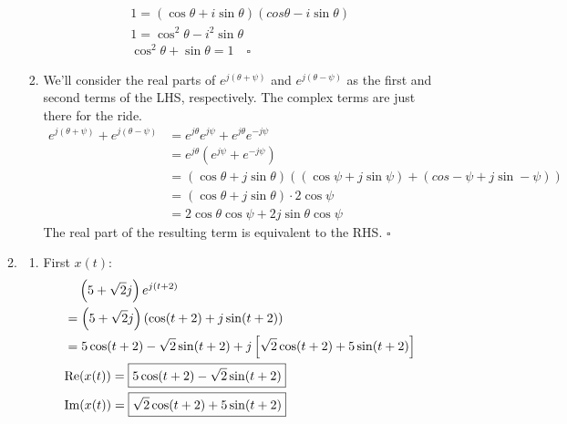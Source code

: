 \documentclass[12pt]{article}
\begin{document}
\begin{enumerate}
\begin{enumerate}
\begin{enumerate}
\begin{gather*}
                                          1=(\cos \theta +i \sin \theta)(cos \theta-i \sin \theta) \\
                                          1=\cos^2 \theta - i^2 \sin \theta \\
                                          \cos^2 \theta + \sin \theta = 1\quad\square
                                    \end{gather*}
                              \item We'll consider the real parts of $e^{j(\theta+\psi)}$ and $e^{j(\theta-\psi)}$
                                    as the first and second terms of the LHS, respectively.
                                    The complex terms are just there for the ride.
                                    \begin{align*}
                                          e^{j(\theta+\psi)}+e^{j(\theta-\psi)}
                                           & = e^{j\theta}e^{j\psi}+e^{j\theta}e^{-j\psi}                                        \\
                                           & = e^{j\theta}\left(e^{j\psi}+e^{-j\psi}\right)                                      \\
                                           & = (\cos \theta + j \sin \theta)((\cos \psi + j\sin \psi)+(cos -\psi + j\sin -\psi)) \\
                                           & = (\cos \theta + j \sin \theta) \cdot 2\cos \psi                                    \\
                                           & = 2\cos\theta\cos\psi + 2j\sin\theta\cos\psi
                                    \end{align*}
                                    The real part of the resulting term is equivalent to the RHS. $\square$
                        \end{enumerate}
                  \item \begin{enumerate}
                              \item First $x(t)$:
                                    \begin{align*}
                                           & \hphantom{={}} \left(5+\sqrt{2}j\right)e^{j(t+2)}                          \\
                                           & = \left(5+\sqrt{2}j\right)(\cos(t+2)+j\sin(t+2))                           \\
                                           & = 5 \cos(t+2)-\sqrt{2}\sin(t+2)+j\left[\sqrt{2}\cos(t+2)+5\sin(t+2)\right] \\
                                           & \text{Re}(x(t)) = \boxed{5\cos(t+2)-\sqrt{2}\sin(t+2)}                     \\
                                           & \text{Im}(x(t)) = \boxed{\sqrt{2}\cos(t+2)+5\sin(t+2)}
                                    \end{align*}


\end{enumerate}
\end{enumerate}
\end{enumerate}
\end{document}
